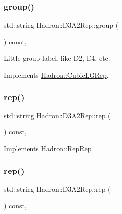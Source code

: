 \subsubsection{\texorpdfstring{group()}{group()}\hspace{0.1cm}{\footnotesize\ttfamily [3/3]}}
{\footnotesize\ttfamily std\+::string Hadron\+::\+D3\+A2\+Rep\+::group (\begin{DoxyParamCaption}{ }\end{DoxyParamCaption}) const\hspace{0.3cm}{\ttfamily [inline]}, {\ttfamily [virtual]}}

Little-\/group label, like D2, D4, etc. 

Implements \mbox{\hyperlink{structHadron_1_1CubicLGRep_a9bdb14b519a611d21379ed96a3a9eb41}{Hadron\+::\+Cubic\+L\+G\+Rep}}.

\mbox{\label{structHadron_1_1D3A2Rep_a068031a95b51a3bb6b3219e51de41db2}} 
\subsubsection{\texorpdfstring{rep()}{rep()}\hspace{0.1cm}{\footnotesize\ttfamily [1/3]}}
{\footnotesize\ttfamily std\+::string Hadron\+::\+D3\+A2\+Rep\+::rep (\begin{DoxyParamCaption}{ }\end{DoxyParamCaption}) const\hspace{0.3cm}{\ttfamily [inline]}, {\ttfamily [virtual]}}



Implements \mbox{\hyperlink{structHadron_1_1RepRep_ab3213025f6de249f7095892109575fde}{Hadron\+::\+Rep\+Rep}}.

\mbox{\label{structHadron_1_1D3A2Rep_a068031a95b51a3bb6b3219e51de41db2}} 
\subsubsection{\texorpdfstring{rep()}{rep()}\hspace{0.1cm}{\footnotesize\ttfamily [2/3]}}
{\footnotesize\ttfamily std\+::string Hadron\+::\+D3\+A2\+Rep\+::rep (\begin{DoxyParamCaption}{ }\end{DoxyParamCaption}) const\hspace{0.3cm}{\ttfamily [inline]}, {\ttfamily [virtual]}}



